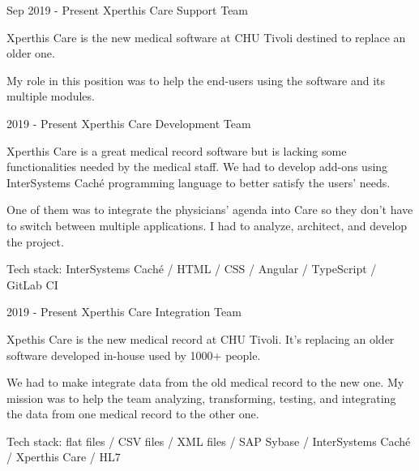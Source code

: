 

\begin{cventries}

  \cventry
    {Sep 2019 - Present} %
    {Xperthis Care Support Team} %
    {} %
    {} %
    {
Xperthis Care is the new medical software at CHU Tivoli destined to replace an older one.

My role in this position was to help the end-users using the software and its multiple modules.

    }
    
  \cventry
    {2019 - Present} %
    {Xperthis Care Development Team} %
    {} %
    {} %
    {
Xperthis Care is a great medical record software but is lacking some functionalities needed by the medical staff. We had to develop add-ons using InterSystems Caché programming language to better satisfy the users' needs.

One of them was to integrate the physicians' agenda into Care so they don't have to switch between multiple applications. I had to analyze, architect, and develop the project.

Tech stack: InterSystems Caché / HTML / CSS / Angular / TypeScript / GitLab CI

    }
    
    
  \cventry
    {2019 - Present} %
    {Xperthis Care Integration Team} %
    {} %
    {} %
    {
Xpethis Care is the new medical record at CHU Tivoli. It's replacing an older software developed in-house used by 1000+ people.

We had to make integrate data from the old medical record to the new one. My mission was to help the team analyzing, transforming, testing, and integrating the data from one medical record to the other one.

Tech stack: flat files / CSV files / XML files / SAP Sybase / InterSystems Caché / Xperthis Care / HL7

}
\end{cventries}
